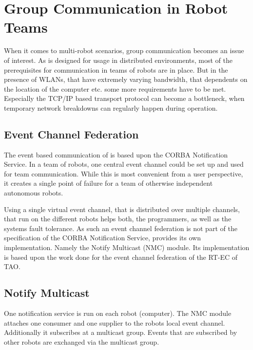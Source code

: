 \chapter{Group Communication in Robot Teams}
\label{sec:NMC}

When it comes to multi-robot scenarios, group communication becomes an
issue of interest. As \miro is designed for usage in distributed
environments, most of the prerequisites for communication in teams of
robots are in place. But in the presence of WLANs, that have extremely
varying bandwidth, that dependents on the location of the computer
etc. some more requirements have to be met. Especially the TCP/IP
based transport protocol can become a bottleneck, when temporary
network breakdowns can regularly happen during operation.

\section{Event Channel Federation}

The event based communication of \miro is based upon the CORBA
Notification Service. In a team of robots, one central event
channel could be set up and used for team communication. While this is
most convenient from a user perspective, it creates a single point of
failure for a team of otherwise independent autonomous robots.

Using a single virtual event channel, that is distributed over
multiple channels, that run on the different robots helps both, the
programmers, as well as the systems fault tolerance. As such an event
channel federation is not part of the specification of the CORBA
Notification Service, \miro provides its own implementation. Namely
the Notify Multicast (NMC) module. Its implementation is based upon the work
done for the event channel federation of the RT-EC of TAO.

\section{Notify Multicast}

One notification service is run on each robot (computer). The NMC
module attaches one consumer and one supplier to the robots local
event channel. Additionally it subscribes at a multicast group. Events
that are subscribed by other robots are exchanged via the multicast
group.

